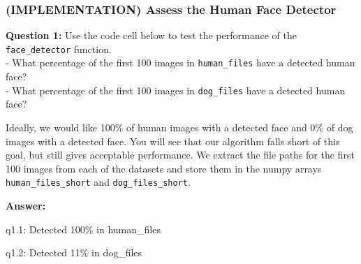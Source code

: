 \documentclass[11pt]{article}
\begin{document}
    \hypertarget{implementation-assess-the-human-face-detector}{%
\subsubsection{(IMPLEMENTATION) Assess the Human Face
Detector}\label{implementation-assess-the-human-face-detector}}

\textbf{Question 1:} Use the code cell below to test the performance of
the \texttt{face\_detector} function.\\
- What percentage of the first 100 images in \texttt{human\_files} have
a detected human face?\\
- What percentage of the first 100 images in \texttt{dog\_files} have a
detected human face?

Ideally, we would like 100\% of human images with a detected face and
0\% of dog images with a detected face. You will see that our algorithm
falls short of this goal, but still gives acceptable performance. We
extract the file paths for the first 100 images from each of the
datasets and store them in the numpy arrays \texttt{human\_files\_short}
and \texttt{dog\_files\_short}.

\textbf{Answer:}

q1.1: Detected 100\% in human\_files

q1.2: Detected 11\% in dog\_files
\end{document}
